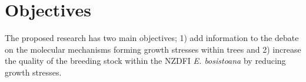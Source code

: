 \section{Objectives}
The proposed research has two main objectives; 1) add information to the
debate on the molecular mechanisms forming growth stresses within trees and 2)
increase the quality of the breeding stock within the NZDFI \textit{E.
bosistoana} by reducing growth stresses.